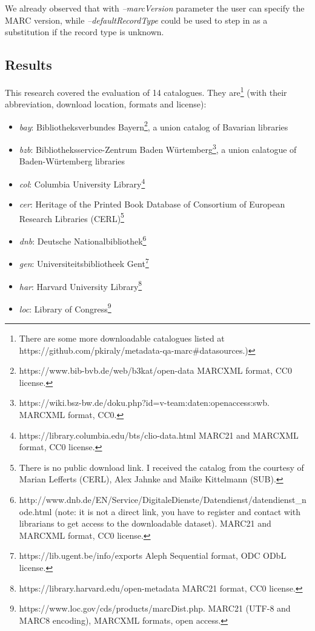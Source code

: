 We already observed that with \emph{--marcVersion} parameter the user can specify the MARC version, while \emph{--defaultRecordType} could be used to step in as a substitution if the record type is unknown.

\subsection{Results}

This research covered the evaluation of 14 catalogues. They are\footnote{There are some more downloadable catalogues listed at https://github.com/pkiraly/metadata-qa-marc\#datasources.)} (with their abbreviation, download location, formats and license):

\begin{itemize}
 \setlength{\parskip}{0pt}
 \setlength{\itemsep}{0pt plus 1pt}
  \item \emph{bay}: Bibliotheksverbundes Bayern\footnote{https://www.bib-bvb.de/web/b3kat/open-data MARCXML format, CC0 license.}, a union catalog of Bavarian libraries
  \item \emph{bzb}: Bibliotheksservice-Zentrum Baden Würtemberg\footnote{https://wiki.bsz-bw.de/doku.php?id=v-team:daten:openaccess:swb. MARCXML format, CC0.}, a union calatogue of Baden-Würtemberg libraries
  \item \emph{col}: Columbia University Library\footnote{https://library.columbia.edu/bts/clio-data.html MARC21 and MARCXML format, CC0 license.}
  \item \emph{cer}: Heritage of the Printed Book Database of Consortium of European Research Libraries (CERL)\footnote{There is no public download link. I received the catalog from the courtesy of Marian Lefferts (CERL), Alex Jahnke and Maike Kittelmann (SUB).}
  \item \emph{dnb}: Deutsche Nationalbibliothek\footnote{http://www.dnb.de/EN/Service/DigitaleDienste/Datendienst\-/datendienst\_node.html (note: it is not a direct link, you have to register and contact with librarians to get access to the downloadable dataset). MARC21 and MARCXML format, CC0 license.}
  \item \emph{gen}: Universiteitsbibliotheek Gent\footnote{https://lib.ugent.be/info/exports Aleph Sequential format, ODC ODbL license.}
  \item \emph{har}: Harvard University Library\footnote{https://library.harvard.edu/open-metadata MARC21 format, CC0 license.}
  \item \emph{loc}: Library of Congress\footnote{https://www.loc.gov/cds/products/marcDist.php. MARC21 (UTF-8 and MARC8 encoding), MARCXML formats, open access.}

\end{itemize}

